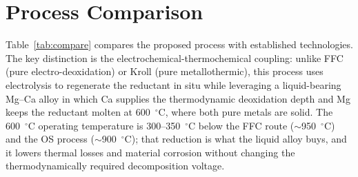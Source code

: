 \documentclass[pdflatex,sn-basic,Numbered]{sn-jnl}
\begin{document}
\section{Process Comparison}\label{sec:comparison}

Table~\ref{tab:compare} compares the proposed process with established technologies. The key distinction is the electrochemical-thermochemical coupling: unlike FFC (pure electro-deoxidation) or Kroll (pure metallothermic), this process uses electrolysis to regenerate the reductant in situ while leveraging a liquid-bearing Mg--Ca alloy in which Ca supplies the thermodynamic deoxidation depth and Mg keeps the reductant molten at 600~$^{\circ}$C, where both pure metals are solid. The 600~$^{\circ}$C operating temperature is 300--350~$^{\circ}$C below the FFC route ($\sim$950~$^{\circ}$C) and the OS process ($\sim$900~$^{\circ}$C); that reduction is what the liquid alloy buys, and it lowers thermal losses and material corrosion without changing the thermodynamically required decomposition voltage.
\end{document}
